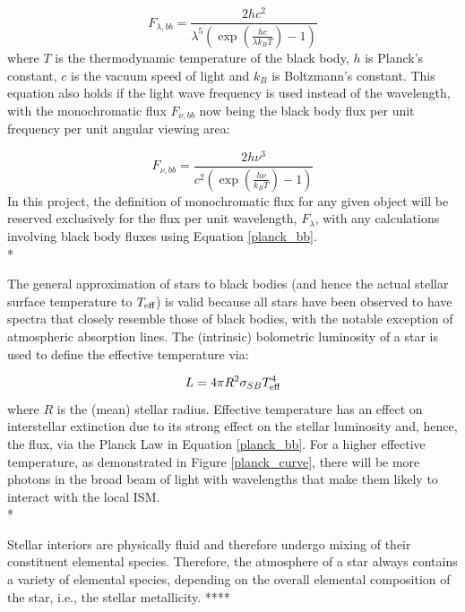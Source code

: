 \documentclass[12pt, a4paper]{report}
\begin{document}
\begin{equation}
F_{\lambda,bb} = \frac{2hc^{2}}{\lambda^{5}\left(\exp\left({\frac{hc}{\lambda k_{B}T}}\right) - 1\right)}
\label{planck_bb}
\end{equation}
where $T$ is the thermodynamic temperature of the black body, $h$ is Planck's constant, $c$ is the vacuum speed of light and $k_{B}$ is Boltzmann's constant. This equation also holds if the light wave frequency is used instead of the wavelength, with the monochromatic flux $F_{\nu,bb}$ now being the black body flux per unit frequency per unit angular viewing area:

\begin{equation}
F_{\nu,bb} = \frac{2h\nu^{3}}{c^{2}\left(\exp\left({\frac{h\nu}{k_{B}T}}\right) - 1\right)}
\label{planck_bb_freq}
\end{equation}
In this project, the definition of monochromatic flux for any given object will be reserved exclusively for the flux per unit wavelength, $F_{\lambda}$, with any calculations involving black body fluxes using Equation \ref{planck_bb}. \\*

The general approximation of stars to black bodies (and hence the actual stellar surface temperature to $T_{\textnormal{eff}}$) is valid because all stars have been observed to have spectra that closely resemble those of black bodies, with the notable exception of atmospheric absorption lines. The (intrinsic) bolometric luminosity of a star is used to define the effective temperature via:

\begin{equation}
L = 4 \pi R^{2} \sigma_{SB} T_{\textnormal{eff}}^{4}
\label{Teff_def}
\end{equation}
where $R$ is the (mean) stellar radius. Effective temperature has an effect on interstellar extinction due to its strong effect on the stellar luminosity and, hence, the flux, via the Planck Law in Equation \ref{planck_bb}. For a higher effective temperature, as demonstrated in Figure \ref{planck_curve}, there will be more photons in the broad beam of light with wavelengths that make them likely to interact with the local ISM. \\*

Stellar interiors are physically fluid and therefore undergo mixing of their constituent elemental species. Therefore, the atmosphere of a star always contains a variety of elemental species, depending on the overall elemental composition of the star, i.e., the stellar metallicity. ****
\end{document}
